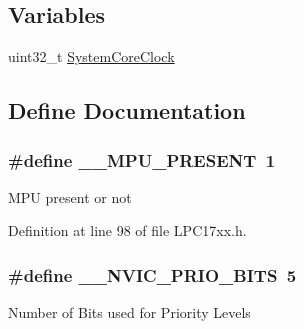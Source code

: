 \subsection*{\-Variables}
\begin{DoxyCompactItemize}
\item 
uint32\-\_\-t \hyperlink{group___l_p_c17xx___system_gaa3cd3e43291e81e795d642b79b6088e6}{\-System\-Core\-Clock}
\end{DoxyCompactItemize}


\subsection{\-Define \-Documentation}
\hypertarget{group___l_p_c17xx___system_ga4127d1b31aaf336fab3d7329d117f448}{
\subsubsection[{\-\_\-\-\_\-\-M\-P\-U\-\_\-\-P\-R\-E\-S\-E\-N\-T}]{\setlength{\rightskip}{0pt plus 5cm}\#define {\bf \-\_\-\-\_\-\-M\-P\-U\-\_\-\-P\-R\-E\-S\-E\-N\-T}~1}}\label{group___l_p_c17xx___system_ga4127d1b31aaf336fab3d7329d117f448}
\-M\-P\-U present or not 

\-Definition at line 98 of file \-L\-P\-C17xx.\-h.

\hypertarget{group___l_p_c17xx___system_gae3fe3587d5100c787e02102ce3944460}{
\subsubsection[{\-\_\-\-\_\-\-N\-V\-I\-C\-\_\-\-P\-R\-I\-O\-\_\-\-B\-I\-T\-S}]{\setlength{\rightskip}{0pt plus 5cm}\#define {\bf \-\_\-\-\_\-\-N\-V\-I\-C\-\_\-\-P\-R\-I\-O\-\_\-\-B\-I\-T\-S}~5}}\label{group___l_p_c17xx___system_gae3fe3587d5100c787e02102ce3944460}
\-Number of \-Bits used for \-Priority \-Levels 

